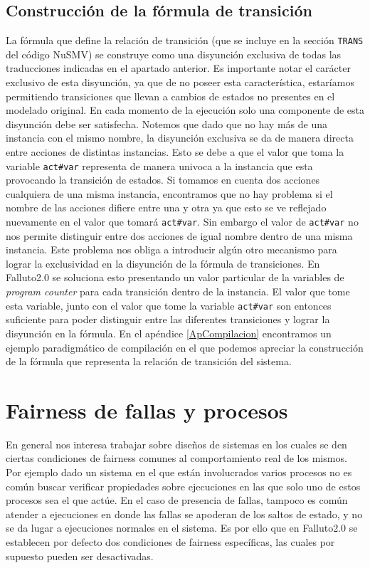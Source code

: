 \documentclass[pdftex,a4paper,12pt]{book}
\begin{document}
\subsection*{Construcci\'on de la f\'ormula de transici\'on}
La f\'ormula que define la relaci\'on de transici\'on (que se incluye en la secci\'on \texttt{TRANS} del c\'odigo NuSMV) se construye como una disyunci\'on exclusiva de todas las traducciones indicadas en el apartado anterior. Es importante notar el car\'acter exclusivo de esta disyunci\'on, ya que de no poseer esta caracter\'istica, estar\'iamos permitiendo transiciones que llevan a cambios de estados no presentes en el modelado original. En cada momento de la ejecuci\'on solo una componente de esta disyunci\'on debe ser satisfecha. Notemos que dado que no hay m\'as de una instancia con el mismo nombre, la disyunci\'on exclusiva se da de manera directa entre acciones de distintas instancias. Esto se debe a que el valor que toma la variable \texttt{act\#var} representa de manera univoca a la instancia que esta provocando la transici\'on de estados. Si tomamos en cuenta dos acciones cualquiera de una misma instancia, encontramos que no hay problema si el nombre de las acciones difiere entre una y otra ya que esto se ve reflejado nuevamente en el valor que tomar\'a \texttt{act\#var}. Sin embargo el valor de \texttt{act\#var} no nos permite distinguir entre dos acciones de igual nombre dentro de una misma instancia. Este problema nos obliga a introducir alg\'un otro mecanismo para lograr la exclusividad en la disyunci\'on de la f\'ormula de transiciones. En Falluto2.0 se soluciona esto presentando un valor particular de la variables de \textit{program counter} para cada transici\'on dentro de la instancia. El valor que tome esta variable, junto con el valor que tome la variable \texttt{act\#var} son entonces suficiente para poder distinguir entre las diferentes transiciones y lograr la disyunci\'on en la f\'ormula. En el ap\'endice \ref{ApCompilacion} encontramos un ejemplo paradigm\'atico de compilaci\'on en el que podemos apreciar la construcci\'on de la f\'ormula que representa la relaci\'on de transici\'on del sistema.

\section{Fairness de fallas y procesos}
En general nos interesa trabajar sobre dise\~nos de sistemas en los cuales se den ciertas condiciones de fairness comunes al comportamiento real de los mismos. Por ejemplo dado un sistema en el que est\'an involucrados varios procesos no es com\'un buscar verificar propiedades sobre ejecuciones en las que solo uno de estos procesos sea el que act\'ue. En el caso de presencia de fallas, tampoco es com\'un atender a ejecuciones en donde las fallas se apoderan de los saltos de estado, y no se da lugar a ejecuciones normales en el sistema. Es por ello que en Falluto2.0 se establecen por defecto dos condiciones de fairness espec\'ificas, las cuales por supuesto pueden ser desactivadas.
\end{document}
